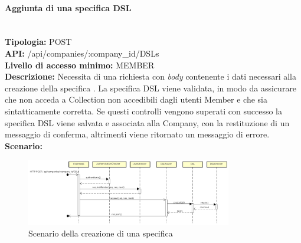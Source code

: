 \newpage
\paragraph{Aggiunta di una specifica DSL}\mbox{}\\
\textbf{Tipologia:} POST \\
\textbf{API:} /api/companies/:company\_id/DSLs \\
\textbf{Livello di accesso minimo:} MEMBER \\
\textbf{Descrizione:} Necessita di una richiesta con \textit{body} contenente i dati necessari alla creazione della specifica . La specifica DSL viene validata, in modo da assicurare che non acceda a Collection non accedibili dagli utenti Member e che sia sintatticamente corretta. Se questi controlli vengono superati con successo la specifica DSL viene salvata e associata alla Company, con la restituzione di un messaggio di conferma, altrimenti viene ritornato un messaggio di errore. \\
\textbf{Scenario:} 
\begin{figure}[H]
\centering
\includegraphics[width=0.8\textwidth]{res/sections/backend/sequence/(POST)dsl.png}
\caption{Scenario della creazione di una specifica }
\end{figure}

\newpage
